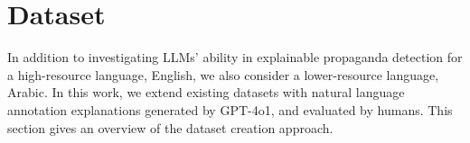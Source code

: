\section{Dataset}
\label{sec:dataset}
In addition to investigating LLMs' ability in explainable propaganda detection for a high-resource language, English, we also consider a lower-resource language, Arabic. In this work, we extend existing datasets with natural language annotation explanations generated by GPT-4o1, and evaluated by humans. This section gives an overview of the dataset creation approach.      
\begin{comment}
\begin{table}[t]
\centering
\setlength{\tabcolsep}{2pt} 
\scalebox{0.71}{%
\begin{tabular}{lrrrrrr}
\toprule
\textbf{Split} & \multicolumn{1}{l}{\textbf{\# Articles}} & \multicolumn{1}{l}{\textbf{\#items}} & \multicolumn{1}{l}{\textbf{(W)}} & \multicolumn{1}{l}{\textbf{Avg (W)}} & \multicolumn{1}{l}{\textbf{Avg Exp. (W)}} & \multicolumn{1}{l}{\textbf{\% Prop.}} \\
\hline
\multicolumn{7}{c}{\textbf{Arabic}}\\
\hline
Train & 8,103 &18,453    &597,604 & 32.4     & 48.1 &63.8\%  \\
Dev   & 822   &1,318     &42,944  & 32.6     & 47.9 &64.4\%  \\
Test  & 835   &1,326     &46,484  & 35.1     & 48.7 &61.3\%  \\ \midrule
\textbf{Total} & \textbf{8,913$^{*}$}        & \textbf{21,097}  & \textbf{687,032} & \textbf{32.6}     & 48.1 &\textbf{63.7\%}\\
\hline
\multicolumn{7}{c}{\textbf{English}}\\
\hline
Train & 250   &4,472     &107,517 & 24.0     & 61.2 &26.9\%  \\
Dev   & 204   &621       &14,871  & 23.9     & 61.6 &27.9\%  \\
Test  & 225   &922       &21,862  & 23.7     & 61.2 &27.9\%  \\ \midrule
\textbf{Total} & \textbf{250$^{*}$} & \textbf{6,015}   & \textbf{144,250} & \textbf{24.0}     & \textbf{61.2} &\textbf{27.2\%}\\
\bottomrule
\end{tabular}%
}
\caption{Distribution of Arabic and English datasets. Exp.: explanation. Data items: annotated data elements including paragraphs and tweets. $^{*}$ Total unique articles. Prop.: Propagandistic. W: \# Words}
  \label{tab:data_stats}
\end{table}
\end{comment}

